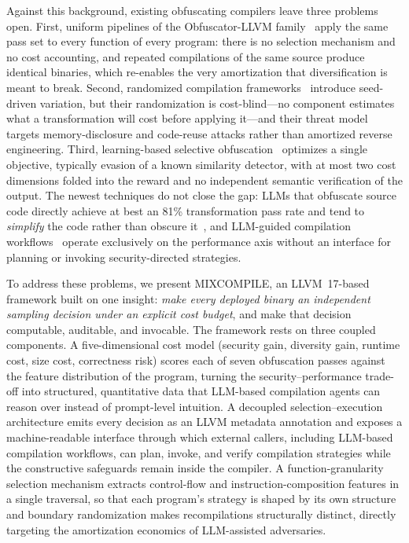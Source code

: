 \documentclass[pdflatex,sn-mathphys-num]{sn-jnl}
\theoremstyle{thmstyleone}%
\theoremstyle{thmstyletwo}%
\theoremstyle{thmstylethree}%
\begin{document}
Against this background, existing obfuscating compilers leave three problems
open. First, uniform pipelines of the Obfuscator-LLVM
family~\cite{bib8,bib9,bib10,bib11,bib12} apply the same pass set to every
function of every program: there is no selection mechanism and no cost
accounting, and repeated compilations of the same source produce identical
binaries, which re-enables the very amortization that diversification is meant
to break. Second, randomized compilation
frameworks~\cite{homescu2013librando,crane2015readactor,koo2018ccr,franzen2023randcompile}
introduce seed-driven variation, but their randomization is cost-blind---no
component estimates what a transformation will cost before applying it---and
their threat model targets memory-disclosure and code-reuse attacks rather than
amortized reverse engineering. Third, learning-based selective
obfuscation~\cite{bib4,wei2025reinobf} optimizes a single objective, typically
evasion of a known similarity detector, with at most two cost dimensions
folded into the reward and no independent semantic verification of the output.
The newest techniques do not close the gap: LLMs that obfuscate source code
directly achieve at best an 81\% transformation pass rate and tend to
\emph{simplify} the code rather than obscure
it~\cite{detomasi2025simplicity}, and LLM-guided compilation
workflows~\cite{li2026autopass} operate exclusively on the performance axis
without an interface for planning or invoking security-directed strategies.

To address these problems, we present MIXCOMPILE, an LLVM~17-based framework
built on one insight: \emph{make every deployed binary an independent sampling
decision under an explicit cost budget}, and make that decision computable,
auditable, and invocable. The framework rests on three coupled components. A
five-dimensional cost model (security gain, diversity gain, runtime cost, size
cost, correctness risk) scores each of seven obfuscation passes against the
feature distribution of the program, turning the security--performance
trade-off into structured, quantitative data that LLM-based compilation agents
can reason over instead of prompt-level intuition. A decoupled
selection--execution architecture emits every decision as an LLVM metadata
annotation and exposes a machine-readable interface through which external
callers, including LLM-based compilation
workflows, can plan, invoke, and verify compilation strategies while the
constructive safeguards remain inside
the compiler. A function-granularity selection mechanism extracts control-flow
and instruction-composition features in a single traversal, so that each
program's strategy is shaped by its own structure and boundary randomization
makes recompilations structurally distinct, directly targeting the amortization
economics of LLM-assisted adversaries.
\end{document}
